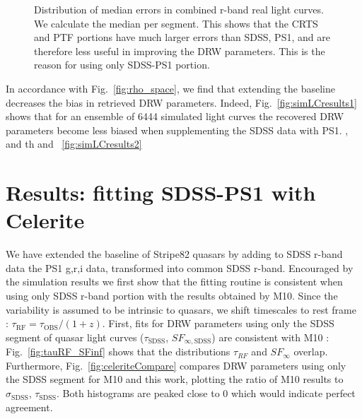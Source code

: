 \documentclass[twocolumn]{aastex62}
\begin{document}
\begin{figure}%
\caption{Distribution of median errors in combined r-band real light curves. We calculate the median per segment. This shows that the CRTS and PTF portions have much larger errors than SDSS, PS1, and are therefore less useful in improving the DRW parameters. This is the reason for using only SDSS-PS1 portion.  }
\label{fig:combinedLCerrors}
\end{figure} 


In accordance with Fig.~\ref{fig:rho_space}, we find that extending the baseline decreases the bias in retrieved DRW parameters. Indeed, Fig.~\ref{fig:simLCresults1} shows that for an ensemble of 6444 simulated light curves the  recovered DRW parameters become less biased when supplementing the SDSS data with PS1. , and th and ~\ref{fig:simLCresults2} 

\begin{figure*}
\caption{Retrieved $\tau$ and $\sigma$  parameters for simulated LCs. }
\label{fig:simLCresults1}
\end{figure*} 

\begin{figure*}
\caption{Comparison of retrieved parameters in relation to input parameters, shown as Fig.18 in \citet{macleod2011} }
\label{fig:simLCresults2}
\end{figure*} 


\section{Results: fitting SDSS-PS1 with Celerite}\label{sec:results}

We have extended the baseline of Stripe82 quasars by adding to SDSS r-band data the  PS1 g,r,i data, transformed into common SDSS r-band. Encouraged by the simulation results we first show that the fitting routine is consistent when using only SDSS r-band portion with the results obtained by M10. Since the variability is assumed to be intrinsic to quasars, we shift timescales to rest frame : $\tau_{\mathrm{RF}} = \tau_{\mathrm{OBS}} / (1+z)$.  First, fits for DRW parameters using only the SDSS segment of quasar light curves ($\tau_{\mathrm{SDSS}}$, $SF_{\infty, \mathrm{SDSS}}$) are consistent with M10 : Fig.~\ref{fig:tauRF_SFinf}  shows that the distributions  $\tau_{RF}$ and $SF_{\infty}$ overlap. Furthermore, Fig.~\ref{fig:celeriteCompare} compares DRW parameters using only the SDSS segment for M10 and this work, plotting the ratio of M10 results to $\sigma_{\mathrm{SDSS}}$, $\tau_{\mathrm{SDSS}}$. Both histograms are peaked close to 0 which would indicate perfect agreement. 
\end{document}
